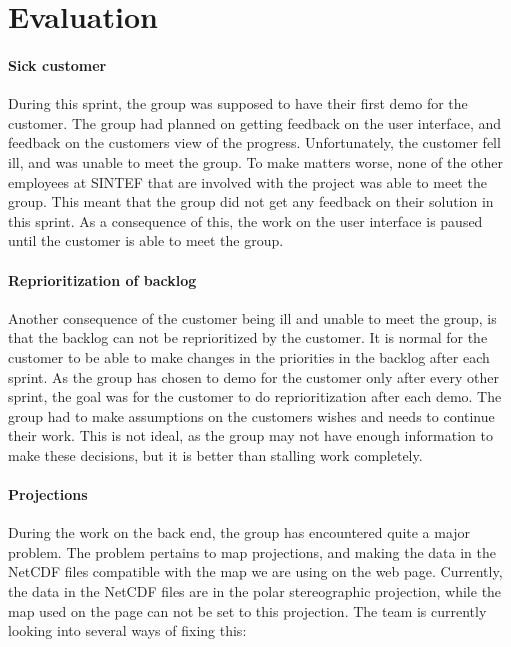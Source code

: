 \documentclass[11pt,a4paper,titlepage,oneside]{report}
\begin{document}
\section{Evaluation}
\paragraph{Sick customer}
During this sprint, the group was supposed to have their first demo for the customer. The group had planned on getting feedback on the user interface, and feedback on the customers view of the progress. Unfortunately, the customer fell ill, and was unable to meet the group. To make matters worse, none of the other employees at SINTEF that are involved with the project was able to meet the group. This meant that the group did not get any feedback on their solution in this sprint. As a consequence of this, the work on the user interface is paused until the customer is able to meet the group. 

\paragraph{Reprioritization of backlog}
Another consequence of the customer being ill and unable to meet the group, is that the backlog can not be reprioritized by the customer. It is normal for the customer to be able to make changes in the priorities in the backlog after each sprint. As the group has chosen to demo for the customer only after every other sprint, the goal was for the customer to do reprioritization after each demo. The group had to make assumptions on the customers wishes and needs to continue their work. This is not ideal, as the group may not have enough information to make these decisions, but it is better than stalling work completely. 

\paragraph{Projections}
During the work on the back end, the group has encountered quite a major problem. The problem pertains to map projections, and making the data in the NetCDF files compatible with the map we are using on the web page. Currently, the data in the NetCDF files are in the polar stereographic projection, while the map used on the page can not be set to this projection. The team is currently looking into several ways of fixing this:
\end{document}
